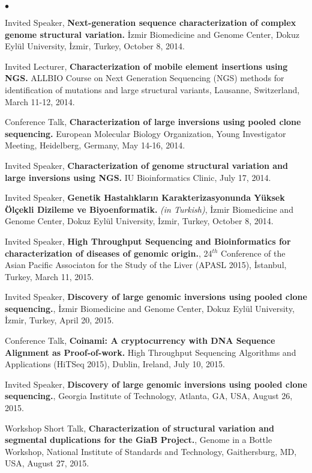 \documentclass[margin,line]{res}
\newenvironment{list2}{
  \begin{list}{$\bullet$}{%
      \setlength{\itemsep}{0in}
      \setlength{\parsep}{0in} \setlength{\parskip}{0in}
      \setlength{\topsep}{0in} \setlength{\partopsep}{0in} 
      \setlength{\leftmargin}{0.2in}}}{\end{list}}
\begin{document}
\begin{resume}
\begin{list2}
\item
  Invited Speaker, 
  {\bf  Next-generation sequence characterization of complex genome structural variation.}
  İzmir Biomedicine and Genome Center, Dokuz Eylül University, İzmir, Turkey, October 8, 2014.
\item
  Invited Lecturer, 
  {\bf Characterization of mobile element insertions using NGS.}
  ALLBIO Course on Next Generation Sequencing (NGS) methods for identification of mutations and large structural variants,
  Lausanne, Switzerland, March 11-12, 2014.
\clearpage
\item
  Conference Talk, 
  {\bf Characterization of large inversions using pooled clone sequencing.}
  European Molecular Biology Organization, Young Investigator Meeting, Heidelberg, Germany, May 14-16, 2014.
\item
  Invited Speaker, 
  {\bf Characterization of  genome structural variation and large inversions using NGS.}
  IU Bioinformatics Clinic, July 17, 2014. 
\item
  Invited Speaker, 
  {\bf Genetik Hastalıkların Karakterizasyonunda Yüksek Ölçekli Dizileme ve Biyoenformatik.} {\it (in Turkish)},
  İzmir Biomedicine and Genome Center, Dokuz Eylül University, İzmir, Turkey, October 8, 2014.
\item
  Invited Speaker, 
  {\bf High Throughput Sequencing and Bioinformatics for characterization of diseases of genomic origin.},
  24$^{th}$ Conference of the Asian Pacific Associaton for the Study of the Liver (APASL 2015), İstanbul, Turkey, March 11, 2015.
\item
  Invited Speaker, 
  {\bf Discovery of large genomic inversions using pooled clone sequencing.},
  İzmir Biomedicine and Genome Center, Dokuz Eylül University, İzmir, Turkey, April 20, 2015.
\item
  Conference Talk, 
  {\bf Coinami: A cryptocurrency with DNA Sequence Alignment as Proof-of-work.}
  High Throughput Sequencing Algorithms and Applications (HiTSeq 2015), Dublin, Ireland, July 10, 2015.
\item
  Invited Speaker, 
  {\bf Discovery of large genomic inversions using pooled clone sequencing.},
  Georgia Institute of Technology, Atlanta, GA, USA, August 26, 2015.
\item
  Workshop Short Talk, 
  {\bf Characterization of structural variation and segmental duplications for the GiaB Project.},
  Genome in a Bottle Workshop, National Institute of Standards and Technology, Gaithersburg, MD, USA,
  August 27, 2015.


\end{list2}
\end{resume}
\end{document}
